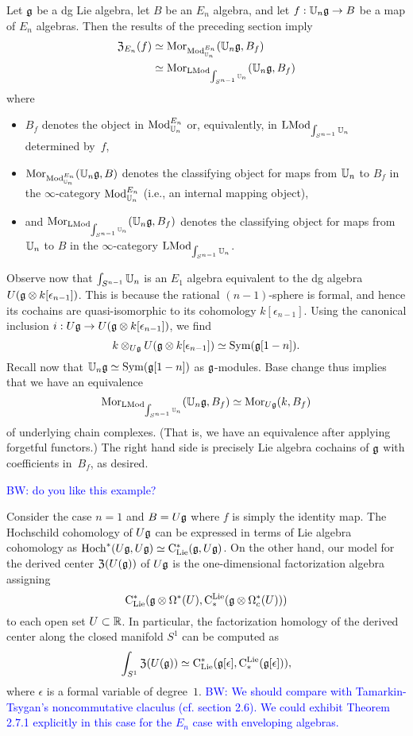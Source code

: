 \documentclass[11pt]{amsart}
\numberwithin{equation}{section}
\def\brian{\textcolor{blue}{BW: }\textcolor{blue}}
\begin{document}
Let $\mathfrak g$ be a dg Lie algebra, let $B$ be an $E_n$ algebra, and let $f: \mathbb U_n \mathfrak g \to B$ be a map of $E_n$ algebras.
Then the results of the preceding section imply
\begin{align*}
{\frak Z}_{E_n}(f) &\simeq {{\rm Mor}}_{{\rm Mod}^{E_n}_{\mathbb U_n}}(\mathbb U_n \mathfrak g, B_f) \\
&\simeq {\rm Mor}_{{\rm LMod}_{\int_{S^{n-1}} \mathbb U_n}}(\mathbb U_n \mathfrak g, B_f)
\end{align*}
where 
\begin{itemize}
\item $B_f$ denotes the object in ${\rm Mod}^{E_n}_{\mathbb U_n}$ or, equivalently, in ${\rm LMod}_{\int_{S^{n-1}}\mathbb U_n}$ determined by~$f$,
\item ${\rm Mor}_{{\rm Mod}^{E_n}_{\mathbb U_n}}(\mathbb U_n \mathfrak g, B)$ denotes the classifying object for maps from $\mathbb U_n$ to $B_f$ in the $\infty$-category ${\rm Mod}^{E_n}_{\mathbb U_n}$ (i.e., an internal mapping object),
\item and ${\rm Mor}_{{\rm LMod}_{\int_{S^{n-1}} \mathbb U_n}} (\mathbb U_n \mathfrak g, B_f)$ denotes the classifying object for maps from ${\mathbb U_n}$ to $B$ in the $\infty$-category ${\rm LMod}_{\int_{S^{n-1}}\mathbb U_n}$.
\end{itemize}
Observe now that $\int_{S^{n-1}}\mathbb U_n$ is an $E_1$ algebra equivalent to the dg algebra $U(\mathfrak g \otimes k[\epsilon_{n-1}])$.
This is because the rational $(n-1)$-sphere is formal, and hence its cochains are quasi-isomorphic to its cohomology $k[\epsilon_{n-1}]$.
Using the canonical inclusion $i: U\mathfrak g \to U(\mathfrak g \otimes k[\epsilon_{n-1}])$,
we find
\[
k \otimes_{U\mathfrak g} U(\mathfrak g \otimes k[\epsilon_{n-1}]) \simeq {\rm Sym}(\mathfrak g[1-n]).
\]
Recall now that $\mathbb U_n \mathfrak g \simeq {\rm Sym}(\mathfrak g[1-n])$ as $\mathfrak g$-modules.
Base change thus implies that we have an equivalence
\[
{\rm Mor}_{{\rm LMod}_{\int_{S^{n-1}} \mathbb U_n}} (\mathbb U_n \mathfrak g, B_f)  \simeq {\rm Mor}_{U\mathfrak g} (k, B_f)
\]
of underlying chain complexes.
(That is, we have an equivalence after applying forgetful functors.)
The right hand side is precisely Lie algebra cochains of $\mathfrak g$ with coefficients in~$B_f$, as desired.

\brian{do you like this example?}
\begin{eg}\label{eg: TT}
Consider the case $n=1$ and $B = U \mathfrak g$ where $f$ is simply the identity map. 
The Hochschild cohomology of $U \mathfrak g$ can be expressed in terms of Lie algebra cohomology as ${\rm Hoch}^*(U\mathfrak g,U\mathfrak g) \simeq {\rm C}_{\rm Lie}^*(\mathfrak g, U\mathfrak g)$. 
On the other hand, our model for the derived center ${\frak Z}(U(\mathfrak g))$ of $U \mathfrak g$ is the one-dimensional factorization algebra assigning 
\[
{\rm C}_{\rm Lie}^*(\mathfrak g \otimes \Omega^*(U), {\rm C}^{\rm Lie}_*( \mathfrak g \otimes \Omega^*_c(U)))
\]
to each open set $U \subset \mathbb R$.
In particular, the factorization homology of the derived center along the closed manifold $S^1$ can be computed as
\[
\int_{S^1} {\frak Z}(U(\mathfrak g)) \simeq {\rm C}_{\rm Lie}^*(\mathfrak g[\epsilon], {\rm C}^{\rm Lie}_*( \mathfrak g[\epsilon])),
\]
where $\epsilon$ is a formal variable of degree~$1$. 
\brian{We should compare with Tamarkin-Tsygan's noncommutative claculus (cf. section 2.6).
We could exhibit Theorem 2.7.1 explicitly in this case for the $E_n$ case with enveloping algebras.}
\end{eg}
\end{document}
